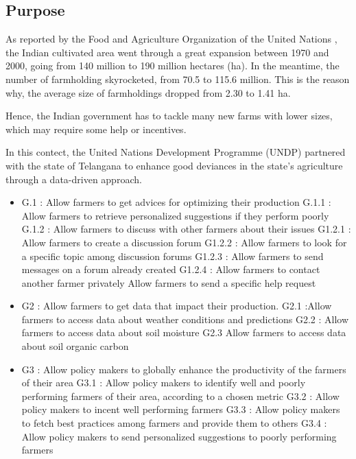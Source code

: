 \subsection{Purpose}
As reported by the Food and Agriculture Organization of the United Nations \cite{fao}, the Indian cultivated area went through a great expansion between 1970 and 2000, going from 140 million to 190 million hectares (ha). In the meantime, the number of farmholding skyrocketed, from 70.5 to 115.6 million. This is the reason why, the average size of farmholdings dropped from 2.30 to 1.41 ha. 

Hence, the Indian government has to tackle many new farms with lower sizes, which may require some help or incentives.

In this contect, the United Nations Development Programme (UNDP) partnered with the state of Telangana to enhance good deviances in the state's agriculture through a data-driven approach. 

\begin{itemize}
	\item
	G.1 : Allow farmers to get advices for optimizing their production
	\subitem
	G.1.1 : Allow farmers to retrieve personalized suggestions if they perform poorly
	\subitem
	G.1.2 : Allow farmers to discuss with other farmers about their issues
	\subitem
	G1.2.1 : Allow farmers to create a discussion forum
	\subitem
	G1.2.2 : Allow farmers to look for a specific topic among discussion forums
	\subitem
	G1.2.3 : Allow farmers to send messages on a forum already created
	\subitem
	G1.2.4 : Allow farmers to contact another farmer privately	
	Allow farmers to send a specific help request
	\item
	G2 : Allow farmers to get data that impact their production. 
	\subitem
	G2.1 :Allow farmers to access data about weather conditions and predictions
	\subitem
	G2.2 :
	Allow farmers to access data about soil moisture
	\subitem
	G2.3
	Allow farmers to access data about soil organic carbon
	\item
	G3 : Allow policy makers to globally enhance the productivity of the farmers of their area
	\subitem
	G3.1 : Allow policy makers to identify well and poorly performing farmers of their area, according to a chosen metric
	\subitem
	G3.2 : Allow policy makers to incent well performing farmers
	\subitem
	G3.3 : Allow policy makers to fetch best practices among farmers and provide them to others
	\subitem
	G3.4 : Allow policy makers to send personalized suggestions to poorly performing farmers

	
\end{itemize}

